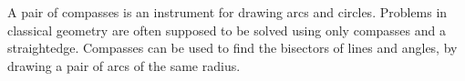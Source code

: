 A pair of compasses is an instrument for drawing arcs and
circles. Problems in classical geometry are often
supposed to be solved using only compasses and a straightedge.
Compasses can be used to find the bisectors of lines and angles,
by drawing a pair of arcs of the same radius.